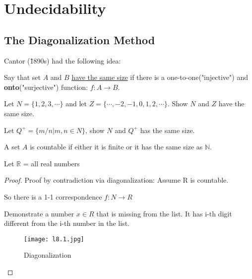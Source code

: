 \chapter{Undecidability}

\section{The Diagonalization Method}

Cantor (\~1890s) had the following idea:
\begin{definition}
    Say that set \(A\) and \(B\) \underline{have the same size} if there is a one-to-one("injective") and \textbf{onto}("surjective") function: \(f: A \rightarrow B\).   
\end{definition}

\begin{example}
    Let \(N = \{ 1, 2, 3, \cdots \} \)  and let \(Z = \{ \cdots, -2, -1, 0, 1, 2, \cdots \} \). Show \(N\) and \(Z\) have the same size.  
\end{example}

\begin{example}
    Let \(Q^+ = \{ m/n  | m, n \in N\} \), show \(N\)  and \(Q^+\) has the same size.  
\end{example}

\begin{definition}[Countable]
    A set \(A\) is countable if either it is finite or it has the same size as \(\mathbb{N} \). 
\end{definition}

\begin{theorem}
    Let \(\mathbb{R}\) = all real numbers 
\end{theorem}
\begin{proof}
   Proof by contradiction via diagonalization: Assume R is countable. 

   So there is a 1-1 correspondence \(f: N \rightarrow R\) 

   Demonstrate a number \(x \in R\) that is missing from the list. It has i-th digit different from the i-th number in the list. 

   \begin{figure}[H]
   \centering
   \texttt{[image: l8.1.jpg]}
   \caption{Diagonalization}
   \end{figure}
\end{proof}


